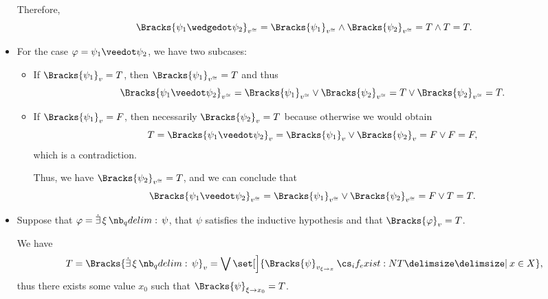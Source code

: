 \begin{defproof}
\begin{itemize}
    Therefore,
    \begin{equation*}
      \Bracks{\psi_1 \synwedge \psi_2}_{v^{\cong}}
      =
      \Bracks{\psi_1}_{v^{\cong}} \wedge \Bracks{\psi_2}_{v^{\cong}}
      =
      T \wedge T
      =
      T.
    \end{equation*}

    \item For the case \( \varphi = \psi_1 \synvee \psi_2 \), we have two subcases:
    \begin{itemize}
      \item If \( \Bracks{\psi_1}_v = T \), then \( \Bracks{\psi_1}_{v^{\cong}} = T \) and thus
      \begin{equation*}
        \Bracks{\psi_1 \synvee \psi_2}_{v^{\cong}}
        =
        \Bracks{\psi_1}_{v^{\cong}} \vee \Bracks{\psi_2}_{v^{\cong}}
        =
        T \vee \Bracks{\psi_2}_{v^{\cong}}
        =
        T.
      \end{equation*}

      \item If \( \Bracks{\psi_1}_v = F \), then necessarily \( \Bracks{\psi_2}_v = T \) because otherwise we would obtain
      \begin{equation*}
        T
        =
        \Bracks{\psi_1 \synvee \psi_2}_v
        =
        \Bracks{\psi_1}_v \vee \Bracks{\psi_2}_v
        =
        F \vee F
        =
        F,
      \end{equation*}
      which is a contradiction.

      Thus, we have \( \Bracks{\psi_2}_{v^{\cong}} = T \), and we can conclude that
      \begin{equation*}
        \Bracks{\psi_1 \synvee \psi_2}_{v^{\cong}}
        =
        \Bracks{\psi_1}_{v^{\cong}} \vee \Bracks{\psi_2}_{v^{\cong}}
        =
        F \vee T
        =
        T.
      \end{equation*}
    \end{itemize}

    \item Suppose that \( \varphi = \qexists \xi \psi \), that \( \psi \) satisfies the inductive hypothesis and that \( \Bracks{\varphi}_v = T \).

    We have
    \begin{equation*}
      T
      =
      \Bracks{ \qexists \xi \psi }_v
      =
      \bigvee\set[\Big]{ \Bracks{\psi}_{v_{\xi \to x}} \given* x \in X },
    \end{equation*}
    thus there exists some value \( x_0 \) such that \( \Bracks{\psi}_{\xi \to x_0} = T \).


\end{itemize}
\end{defproof}
